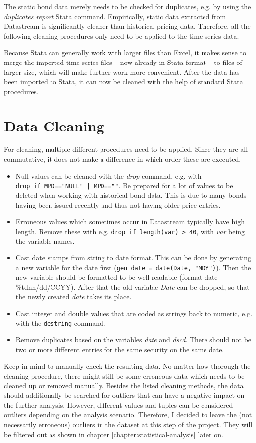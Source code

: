 The static bond data merely needs to be checked for duplicates, e.g. by using the \textit{duplicates report} Stata command. Empirically, static data extracted from Datastream is significantly cleaner than historical pricing data. 
Therefore, all the following cleaning procedures only need to be applied to the time series data.

Because Stata can generally work with larger files than Excel, it makes sense to merge the imported time series files -- now already in Stata format -- to files of larger size, which will make further work more convenient. After the data has been imported to Stata, it can now be cleaned with the help of standard Stata procedures.  

\section{Data Cleaning}
For cleaning, multiple different procedures need to be applied. Since they are all commutative, it does not make a difference in which order these are executed. 
\begin{itemize}
	\item Null values can be cleaned with the \textit{drop} command, e.g. with \\ \lstinline{drop if MPD=="NULL" | MPD==""}. 
	Be prepared for a lot of values to be deleted when working with historical bond data. This is due to many bonds having been issued recently and thus not having older price entries. 
	\item Erroneous values which sometimes occur in Datastream typically have high length. Remove these with e.g. \lstinline{drop if length(var) > 40}, with \textit{var} being the variable names. 
	\item Cast date stamps from string to date format. This can be done by generating a new variable for the date first (\lstinline{gen date = date(Date, "MDY")}). Then the new variable should be formatted to be well-readable (format date \%tdnn/dd/CCYY). After that the old variable \textit{Date} can be dropped, so that the newly created \textit{date} takes its place. 
	\item Cast integer and double values that are coded as strings back to numeric, e.g. with the \lstinline{destring} command. 
	\item Remove duplicates based on the variables \textit{date} and \textit{dscd}. There should not be two or more different entries for the same security on the same date.
\end{itemize}
Keep in mind to manually check the resulting data. No matter how thorough the cleaning procedure, there might still be some erroneous data which needs to be cleaned up or removed manually. Besides the listed cleaning methods, the data should additionally be searched for outliers that can have a negative impact on the further analysis. However, different values and tuples can be considered outliers depending on the analysis scenario. Therefore, I decided to leave the (not necessarily erroneous) outliers in the dataset at this step of the project. They will be filtered out as shown in chapter \ref{chapter:statistical-analysis} later on. 


